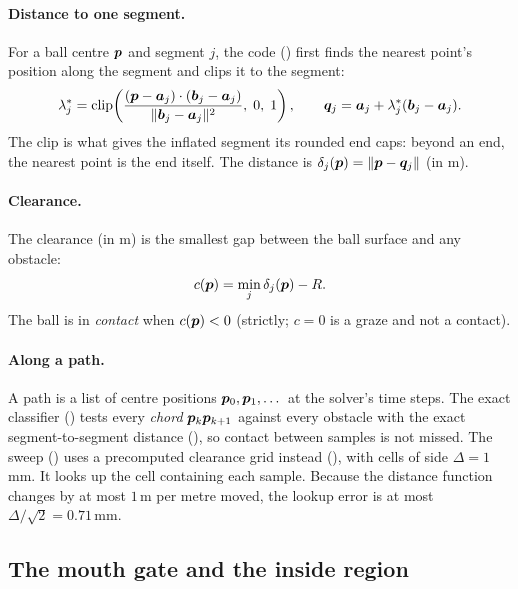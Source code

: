 \paragraph{Distance to one segment.} For a ball centre $\bm{p}$ and segment $j$, the code
() first finds the nearest point's position along the segment and clips it to
the segment:
\begin{equation}
  \lambda_j^\ast = \operatorname{clip}\!\left(
  \frac{(\bm{p}-\bm{a}_j)\cdot(\bm{b}_j-\bm{a}_j)}{\lVert\bm{b}_j-\bm{a}_j\rVert^2},\;0,\;1\right),
  \qquad
  \bm{q}_j = \bm{a}_j + \lambda_j^\ast(\bm{b}_j-\bm{a}_j).
  \label{eq:geometry-nearest}
\end{equation}
The clip is what gives the inflated segment its rounded end caps: beyond an end, the nearest
point is the end itself. The distance is $\delta_j(\bm{p}) = \lVert\bm{p} - \bm{q}_j\rVert$ (in \unit{m}).

\paragraph{Clearance.} The clearance (in \unit{m}) is the smallest gap between the ball surface and
any obstacle:
\begin{equation}
  c(\bm{p}) = \min_j \delta_j(\bm{p}) - R .
  \label{eq:geometry-clearance}
\end{equation}
The ball is in \emph{contact} when $c(\bm{p}) < 0$ (strictly; $c = 0$ is a graze and not a contact).

\paragraph{Along a path.} A path is a list of centre positions $\bm{p}_0, \bm{p}_1, \dots$ at
the solver's time steps. The exact classifier () tests every \emph{chord}
$\bm{p}_k\bm{p}_{k+1}$ against every obstacle with the exact segment-to-segment distance
(), so contact between samples is not missed. The sweep
() uses a precomputed clearance grid instead (), with cells
of side $\Delta = 1$\,\unit{mm}\assumed. It looks up the cell containing each sample. Because the
distance function changes by at most $1$\,\unit{m} per metre moved, the lookup error is at most
$\Delta/\sqrt{2} = 0.71$\,\unit{mm}\derived.

\subsection{The mouth gate and the inside region}
\label{sec:geometry-gate}

